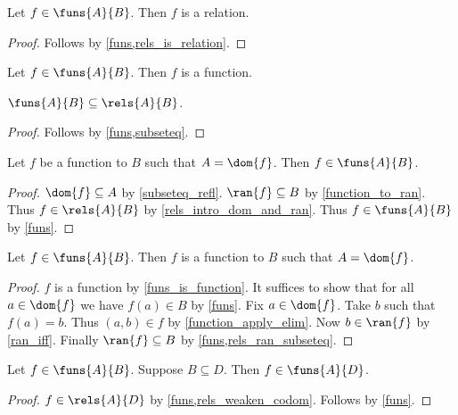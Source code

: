 \begin{proposition}\label{funs_is_relation}
    Let $f\in\funs{A}{B}$.
    Then $f$ is a relation.
\end{proposition}
\begin{proof}
    Follows by \cref{funs,rels_is_relation}.
\end{proof}

\begin{proposition}\label{funs_is_function}
    Let $f\in\funs{A}{B}$.
    Then $f$ is a function.
\end{proposition}

\begin{proposition}\label{funs_subseteq_rels}
    $\funs{A}{B}\subseteq\rels{A}{B}$.
\end{proposition}
\begin{proof}
    Follows by \cref{funs,subseteq}.
\end{proof}

\begin{proposition}\label{funs_intro}
    Let $f$ be a function to $B$ such that $A=\dom{f}$.
    Then $f\in\funs{A}{B}$.
\end{proposition}
\begin{proof}
    $\dom{f}\subseteq A$ by \cref{subseteq_refl}.
    $\ran{f}\subseteq B$ by \cref{function_to_ran}.
    Thus $f\in\rels{A}{B}$ by \cref{rels_intro_dom_and_ran}.
    Thus $f\in\funs{A}{B}$ by \cref{funs}.
\end{proof}

\begin{proposition}\label{funs_elim}
    Let $f\in\funs{A}{B}$.
    Then $f$ is a function to $B$ such that $A= \dom{f}$.
\end{proposition}
\begin{proof}
    $f$ is a function by \cref{funs_is_function}. %
    It suffices to show that for all $a\in\dom{f}$ we have $f(a)\in B$ by \cref{funs}.
    Fix $a\in\dom{f}$.
    Take $b$ such that $f(a) = b$.
    Thus $(a,b)\in f$ by \cref{function_apply_elim}.
    Now $b\in\ran{f}$ by \cref{ran_iff}.
    Finally $\ran{f}\subseteq B$ by \cref{funs,rels_ran_subseteq}.
\end{proof}

\begin{proposition}\label{funs_weaken_codom}
    Let $f\in\funs{A}{B}$.
    Suppose $B\subseteq D$.
    Then $f\in\funs{A}{D}$.
\end{proposition}
\begin{proof}
    $f\in\rels{A}{D}$ by \cref{funs,rels_weaken_codom}.
    Follows by \cref{funs}.
\end{proof}

